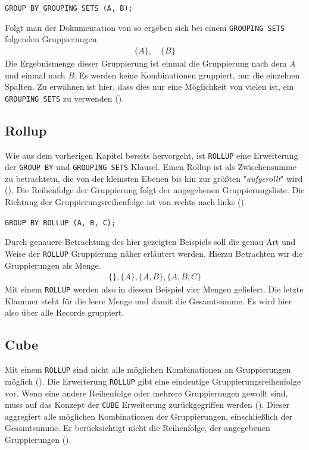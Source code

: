 \texttt{GROUP BY GROUPING SETS (A, B);}

Folgt man der Dokumentation von \cite{oracle16} so ergeben sich bei einem
\texttt{GROUPING SETS} folgenden Gruppierungen:
\begin{align*}
	\{A\}, \quad \{B\}
\end{align*}
Die Ergebnismenge dieser Gruppierung ist einmal die Gruppierung nach dem \textit{A}
und einmal nach \textit{B}. Es werden keine Kombinationen gruppiert, nur die
einzelnen Spalten. Zu erwähnen ist hier, dass dies nur eine Möglichkeit von
vielen ist, ein \texttt{GROUPING SETS} zu verwenden (\cite{oracle16}).

\subsection{Rollup}
Wie aus dem vorherigen Kapitel bereits hervorgeht, ist \texttt{ROLLUP} eine
Erweiterung der \texttt{GROUP BY} und \texttt{GROUPING SETS} Klausel. Einen Rollup
ist als Zwischensumme zu betrachtetn, die von der kleinsten Ebenen bis hin zur
größten "\textit{aufgerollt}" wird (\cite{oracle16}). Die Reihenfolge der
Gruppierung folgt der angegebenen Gruppierungsliste. Die Richtung der Gruppierungsreihenfolge
ist von rechts nach links (\cite{oracle16}).

\texttt{GROUP BY ROLLUP (A, B, C);}

Durch genauere Betrachtung des hier gezeigten Beispiels soll die genau Art und Weise
der \texttt{ROLLUP} Gruppierung näher erläutert werden. Hierzu Betrachten wir die
Gruppierungen als Menge.
\begin{align*}
	\{ \}, \{A\}, \{A, B\}, \{A, B, C\}
\end{align*}
Mit einem \texttt{ROLLUP} werden also in diesem Beispiel vier Mengen geliefert.
Die letzte Klammer steht für die leere Menge und damit die Gesamtsumme. Es wird hier
also über alle Records gruppiert.

\subsection{Cube}
Mit einem \texttt{ROLLUP} sind nicht alle möglichen Kombinationen an
Gruppierungen möglich (\cite{oracle16}). Die Erweiterung \texttt{ROLLUP} gibt
eine eindeutige Gruppierungsreihenfolge vor. Wenn eine andere Reihenfolge oder mehrere
Gruppierungen gewollt sind, muss auf das Konzept der \texttt{CUBE} Erweiterung zurückgegriffen
werden (\cite{oracle16}). Dieser aggregiert alle möglichen Kombinationen der
Gruppierungen, einschließlich der Gesamtsumme. Er berücksichtigt nicht die
Reihenfolge, der angegebenen Gruppierungen (\cite{oracle16}).

